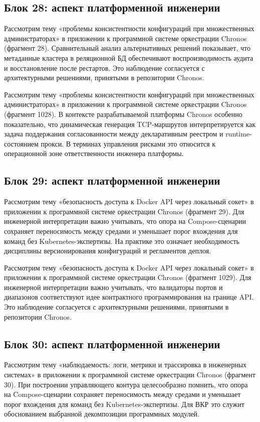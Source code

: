 \subsection{Блок 28: аспект платформенной инженерии}
 Рассмотрим тему «проблемы консистентности конфигураций при множественных администраторах» в приложении к программной системе оркестрации Chronos (фрагмент 28). Сравнительный анализ альтернативных решений показывает, что метаданные кластера в реляционной БД обеспечивают воспроизводимость аудита и восстановление после рестартов. Это наблюдение согласуется с архитектурными решениями, принятыми в репозитории Chronos.

 Рассмотрим тему «проблемы консистентности конфигураций при множественных администраторах» в приложении к программной системе оркестрации Chronos (фрагмент 1028). В контексте разрабатываемой платформы Chronos особенно показательно, что динамическая генерация TCP-маршрутов интерпретируется как задача поддержания согласованности между декларативным реестром и runtime-состоянием прокси. В терминах управления рисками это относится к операционной зоне ответственности инженера платформы.

\subsection{Блок 29: аспект платформенной инженерии}
 Рассмотрим тему «безопасность доступа к Docker API через локальный сокет» в приложении к программной системе оркестрации Chronos (фрагмент 29). Для инженерной интерпретации важно учитывать, что опора на Compose-сценарии сохраняет переносимость между средами и уменьшает порог вхождения для команд без Kubernetes-экспертизы. На практике это означает необходимость дисциплины версионирования конфигураций и регламентов деплоя.

 Рассмотрим тему «безопасность доступа к Docker API через локальный сокет» в приложении к программной системе оркестрации Chronos (фрагмент 1029). Для инженерной интерпретации важно учитывать, что валидаторы портов и диапазонов соответствуют идее контрактного программирования на границе API. Это наблюдение согласуется с архитектурными решениями, принятыми в репозитории Chronos.

\subsection{Блок 30: аспект платформенной инженерии}
 Рассмотрим тему «наблюдаемость: логи, метрики и трассировка в инженерных системах» в приложении к программной системе оркестрации Chronos (фрагмент 30). При построении управляющего контура целесообразно помнить, что опора на Compose-сценарии сохраняет переносимость между средами и уменьшает порог вхождения для команд без Kubernetes-экспертизы. Для ВКР это служит обоснованием выбранной декомпозиции программных модулей.

